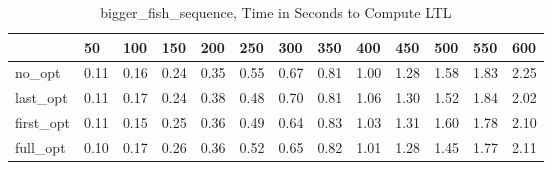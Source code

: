 \begin{table}
\caption{bigger\_fish\_sequence, Time in Seconds to Compute LTL}
\label{bigger_fish_sequence_LTL_time}
\begin{tabular}{lllllllllllll}
\toprule
 & 50 & 100 & 150 & 200 & 250 & 300 & 350 & 400 & 450 & 500 & 550 & 600 \\
\midrule
no\_opt & 0.11 & 0.16 & 0.24 & 0.35 & 0.55 & 0.67 & 0.81 & 1.00 & 1.28 & 1.58 & 1.83 & 2.25 \\
last\_opt & 0.11 & 0.17 & 0.24 & 0.38 & 0.48 & 0.70 & 0.81 & 1.06 & 1.30 & 1.52 & 1.84 & 2.02 \\
first\_opt & 0.11 & 0.15 & 0.25 & 0.36 & 0.49 & 0.64 & 0.83 & 1.03 & 1.31 & 1.60 & 1.78 & 2.10 \\
full\_opt & 0.10 & 0.17 & 0.26 & 0.36 & 0.52 & 0.65 & 0.82 & 1.01 & 1.28 & 1.45 & 1.77 & 2.11 \\
\bottomrule
\end{tabular}
\end{table}
